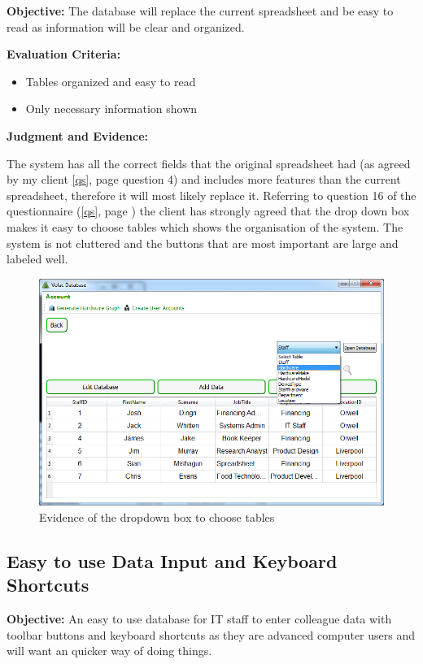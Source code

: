 \textbf{Objective:} The database will replace the current spreadsheet and be easy to read as information will be clear and organized.

\textbf{Evaluation Criteria:}
\begin{itemize}
\item{Tables organized and easy to read}
\item{Only necessary information shown}
\end{itemize}

\textbf{Judgment and Evidence:}

The system has all the correct fields that the original spreadsheet had (as agreed by my client \ref{qs}, page \pageref{qs} question 4) and includes more features than the current spreadsheet, therefore it will most likely replace it. Referring to question 16 of the questionnaire (\ref{qs}, page \pageref{qs}) the client has strongly agreed that the drop down box makes it easy to choose tables which shows the organisation of the system. The system is not cluttered and the buttons that are most important are large and labeled well.

\begin{figure}[H]
    \includegraphics[width=\textwidth]{./Evaluation/Images/cleardb2.png}
    \caption{Evidence of the dropdown box to choose tables} 
\end{figure}

\subsection{Easy to use Data Input and Keyboard Shortcuts}

\textbf{Objective:} An easy to use database for IT staff to enter colleague data with toolbar buttons and keyboard shortcuts as they are advanced computer users and will want an quicker way of doing things.

